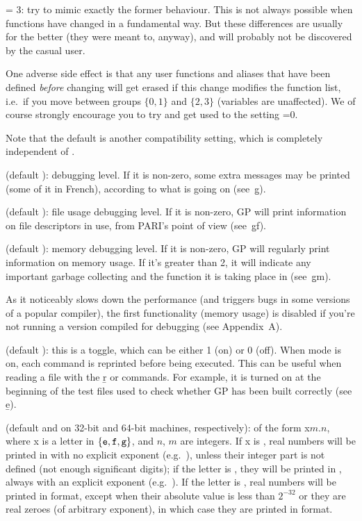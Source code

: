 \quad {} = 3: try to mimic exactly the former behaviour. This
is not always possible when functions have changed in a fundamental way.
But these differences are usually for the better (they were meant to,
anyway), and will probably not be discovered by the casual user.

One adverse side effect is that any user functions and aliases that have
been defined \emph{before} changing  will get erased if this
change modifies the function list, i.e.~if you move between groups
$\{0,1\}$ and $\{2,3\}$ (variables are unaffected). We of course strongly
encourage you to try and get used to the setting =0.

Note that the default  is another compatibility setting,
which is completely independent of .

 (default ): debugging level. If it is non-zero,
some extra messages may be printed (some of it in French), according to
what is going on (see~\b{g}).

 (default ): file usage debugging level. If it
is non-zero, GP will print information on file descriptors in use, from
PARI's point of view (see~\b{gf}).

 (default ): memory debugging level. If it is
non-zero, GP will regularly print information on memory usage. If it's
greater than 2, it will indicate any important garbage collecting and the
function it is taking place in (see~\b{gm}).

 As it noticeably slows down the performance
(and triggers bugs in some versions of a popular compiler), the first
functionality (memory usage) is disabled if you're not running a version
compiled for debugging (see Appendix~A).

 (default ): this is a toggle, which can be either 1
(on) or 0 (off). When  mode is on, each command is reprinted before
being executed. This can be useful when reading a file with the \b{r} or
 commands. For example, it is turned on at the beginning of the test
files used to check whether GP has been built correctly (see \b{e}).

 (default  and  on 32-bit and
64-bit machines, respectively): of the form x$m.n$, where x is a letter in
$\{{\tt e},{\tt f},{\tt g}\}$, and $n$, $m$ are integers. If x is ,
real numbers will be printed in  with no
explicit exponent (e.g.~), unless their integer part is not
defined (not enough significant digits); if the letter is , they
will be printed in , always with an explicit
exponent (e.g.~). If the letter is , real numbers will
be printed in  format, except when their absolute value is less than
$2^{-32}$ or they are real zeroes (of arbitrary exponent), in which case
they are printed in  format.\label{se:format}

